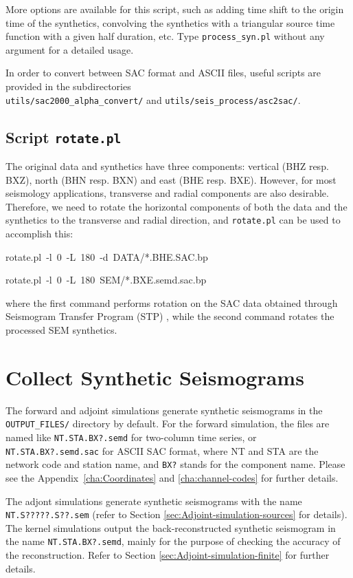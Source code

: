 More options are available for this script, such as adding time shift
to the origin time of the synthetics, convolving the synthetics with
a triangular source time function with a given half duration, etc.
Type \texttt{process\_syn.pl} without any argument for a detailed
usage.

In order to convert between SAC format and ASCII files, useful scripts
are provided in the subdirectories ~\\
 \texttt{utils/sac2000\_alpha\_convert/} and \texttt{utils/seis\_process/asc2sac/}.


\subsection{Script \texttt{rotate.pl}}

The original data and synthetics have three components: vertical (BHZ
resp. BXZ), north (BHN resp. BXN) and east (BHE resp. BXE). However,
for most seismology applications, transverse and radial components
are also desirable. Therefore, we need to rotate the horizontal components
of both the data and the synthetics to the transverse and radial direction,
and \texttt{\small rotate.pl}{\small{} can be used to accomplish this:}{\small \par}
\begin{lyxcode}
rotate.pl~-l~0~-L~180~-d~DATA/{*}.BHE.SAC.bp~

rotate.pl~-l~0~-L~180~SEM/{*}.BXE.semd.sac.bp~
\end{lyxcode}
where the first command performs rotation on the SAC data obtained
through Seismogram Transfer Program (STP) ,
while the second command rotates the processed SEM synthetics.


\section{Collect Synthetic Seismograms}

The forward and adjoint simulations generate synthetic seismograms
in the \texttt{OUTPUT\_FILES/} directory by default. For the forward
simulation, the files are named like \texttt{NT.STA.BX?.semd} for
two-column time series, or \texttt{NT.STA.BX?.semd.sac} for ASCII
SAC format, where NT and STA are the network code and station name,
and \texttt{BX?} stands for the component name. Please see the Appendix~\ref{cha:Coordinates}
and \ref{cha:channel-codes} for further details.

The adjont simulations generate synthetic seismograms with the name
\texttt{NT.S?????.S??.sem} (refer to Section \ref{sec:Adjoint-simulation-sources}
for details). The kernel simulations output the back-reconstructed
synthetic seismogram in the name \texttt{NT.STA.BX?.semd}, mainly
for the purpose of checking the accuracy of the reconstruction. Refer
to Section \ref{sec:Adjoint-simulation-finite} for further details.

